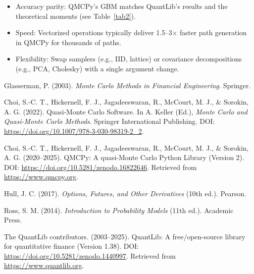 \documentclass{article}
\begin{document}
\bigskip
\begin{tcolorbox}[title=Takeaways,colback=blue!1,colframe=blue!30!black]
\begin{itemize}[topsep=0pt,itemsep=0pt,parsep=0pt,leftmargin=*]
    \item Accuracy parity: QMCPy's GBM matches QuantLib's results and the theoretical moments (see Table~\ref{tab2}).
    \item Speed: Vectorized operations typically deliver 1.5--3$\times$ faster path generation in QMCPy for thousands of paths.
    \item Flexibility: Swap samplers (e.g., IID, lattice) or covariance decompositions (e.g., PCA, Cholesky) with a single argument change.
\end{itemize}
\end{tcolorbox}


\begin{thebibliography}{6}

Glasserman, P. (2003). \textit{Monte Carlo Methods in Financial Engineering}. Springer.

Choi, S.-C. T., Hickernell, F. J., Jagadeeswaran, R., McCourt, M. J., \& Sorokin, A. G. (2022).
Quasi-Monte Carlo Software. In A. Keller (Ed.), \textit{Monte Carlo and Quasi-Monte Carlo Methods}.
Springer International Publishing. DOI: \url{https://doi.org/10.1007/978-3-030-98319-2_2}.

Choi, S.-C. T., Hickernell, F. J., Jagadeeswaran, R., McCourt, M. J., \& Sorokin, A. G. (2020--2025).
QMCPy: A quasi-Monte Carlo Python Library (Version 2).
DOI: \url{https://doi.org/10.5281/zenodo.16822646}. 
Retrieved from \url{https://www.qmcpy.org}.

Hull, J. C. (2017). \textit{Options, Futures, and Other Derivatives} (10th ed.). Pearson.

Ross, S. M. (2014). \textit{Introduction to Probability Models} (11th ed.). Academic Press.

The QuantLib contributors. (2003--2025). 
QuantLib: A free/open-source library for quantitative finance (Version 1.38).
DOI: \url{https://doi.org/10.5281/zenodo.1440997}. 
Retrieved from \url{https://www.quantlib.org}.
\end{thebibliography}
\end{document}
